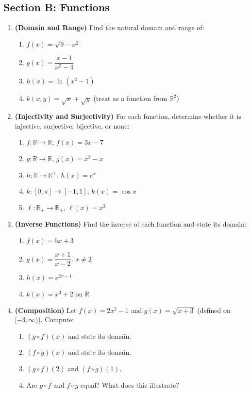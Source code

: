 \documentclass[12pt, a4paper]{article}
\theoremstyle{definition}
\newcommand{\R}{\mathbb{R}}
\begin{document}
\subsection{Section B: Functions}

\begin{enumerate}[label=\textbf{B\arabic*.}, leftmargin=2.5em]

  \item \textbf{(Domain and Range)} Find the natural domain and range of:
  \begin{enumerate}[label=(\alph*)]
    \item $f(x) = \sqrt{9 - x^2}$
    \item $g(x) = \dfrac{x-1}{x^2-4}$
    \item $h(x) = \ln(x^2 - 1)$
    \item $k(x,y) = \sqrt{x} + \sqrt{y}$ (treat as a function from $\R^2$)
  \end{enumerate}

  \item \textbf{(Injectivity and Surjectivity)} For each function, determine whether it is injective, surjective, bijective, or none:
  \begin{enumerate}[label=(\alph*)]
    \item $f: \R \to \R$, $f(x) = 3x - 7$
    \item $g: \R \to \R$, $g(x) = x^3 - x$
    \item $h: \R \to \R^+$, $h(x) = e^x$
    \item $k: [0,\pi] \to [-1,1]$, $k(x) = \cos x$
    \item $\ell: \R_+ \to \R_+$, $\ell(x) = x^3$
  \end{enumerate}

  \item \textbf{(Inverse Functions)} Find the inverse of each function and state its domain:
  \begin{enumerate}[label=(\alph*)]
    \item $f(x) = 5x + 3$
    \item $g(x) = \dfrac{x+1}{x-2}$, $x \neq 2$
    \item $h(x) = e^{2x-1}$
    \item $k(x) = x^3 + 2$ on $\R$
  \end{enumerate}

  \item \textbf{(Composition)} Let $f(x) = 2x^2 - 1$ and $g(x) = \sqrt{x+3}$ (defined on $[-3,\infty)$). Compute:
  \begin{enumerate}[label=(\alph*)]
    \item $(g \circ f)(x)$ and state its domain.
    \item $(f \circ g)(x)$ and state its domain.
    \item $(g \circ f)(2)$ and $(f \circ g)(1)$.
    \item Are $g \circ f$ and $f \circ g$ equal? What does this illustrate?
  \end{enumerate}


\end{enumerate}
\end{document}
